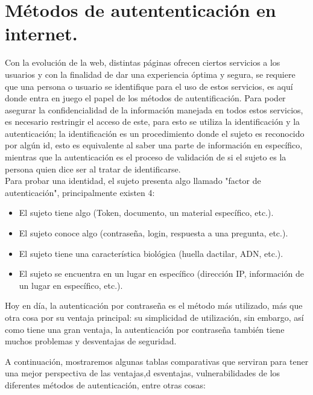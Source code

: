\documentclass[12pt, a4paper, titlepage]{report}
\begin{document}
	    \section{Métodos de autententicación en internet.}
	    Con la evolución de la web, distintas páginas ofrecen ciertos servicios a los usuarios y con la finalidad de dar una experiencia óptima y segura, se requiere que una persona o usuario se identifique para el uso de estos servicios, es aquí donde entra en juego el papel de los métodos de autentificación. Para poder asegurar la confidencialidad de la información manejada en todos estos servicios, es necesario restringir el acceso de este, para esto se utiliza la identificación y la autenticación; la identificación es un procedimiento donde el sujeto es reconocido por algún \acrshort{id}, esto es equivalente al saber una parte de información en específico, mientras que la autenticación es el proceso de validación de si el sujeto es la persona quien dice ser al tratar de identificarse.\cite{articuloAxel}\\
	    
	    Para probar una identidad, el sujeto presenta algo llamado "factor de autenticación", principalmente existen 4: 
	    \begin{itemize}
	        \item El sujeto tiene algo (Token, documento, un material específico, etc.).
	        \item El sujeto conoce algo (contraseña, login, respuesta a una pregunta, etc.).
	        \item El sujeto tiene una característica biológica (huella dactilar, ADN, etc.).
	        \item El sujeto se encuentra en un lugar en específico (dirección IP, información de un lugar en específico, etc.).
	    \end{itemize}
	    Hoy en  día, la autenticación por contraseña es el método más utilizado, más que otra cosa por su ventaja principal: su simplicidad de utilización, sin embargo, así como tiene una gran ventaja, la autenticación por contraseña también tiene muchos problemas y desventajas de seguridad.
	    
	    A continuación, mostraremos algunas tablas comparativas que serviran para tener una mejor perspectiva de las ventajas,d esventajas, vulnerabilidades de los diferentes métodos de autenticación, entre otras cosas:
		
\end{document}

